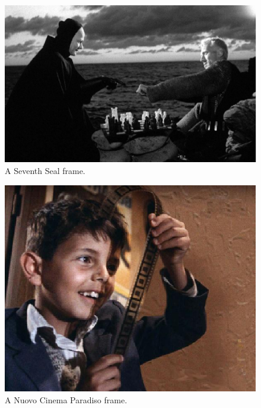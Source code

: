 \begin{figure}[ht!]
 \centering
 \includegraphics[scale=0.3]{image1.eps}
 \caption{A Seventh Seal frame.}
 \label{fig:example}
\end{figure}

\begin{figure}[ht!]
 \centering
 \includegraphics[scale=0.4]{image2.eps}
 \caption{A Nuovo Cinema Paradiso frame.}
 \label{fig:example}
\end{figure}

